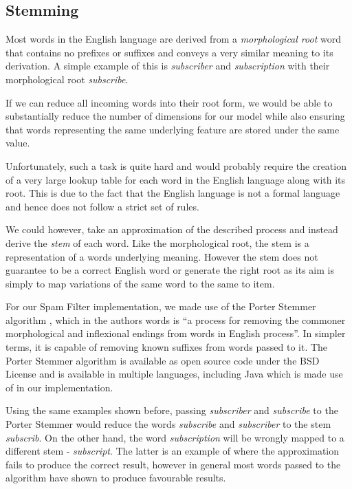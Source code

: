 \subsection{Stemming}
Most words in the English language are derived from a {\it morphological root} word that contains no prefixes or suffixes and conveys a very similar meaning to its derivation. A simple example of this is {\it subscriber} and {\it subscription} with their morphological root {\it subscribe}. 

If we can reduce all incoming words into their root form, we would be able to substantially reduce the number of dimensions for our model while also ensuring that words representing the same underlying feature are stored under the same value.

Unfortunately, such a task is quite hard and would probably require the creation of a very large lookup table for each word in the English language along with its root. This is due to the fact that the English language is not a formal language and hence does not follow a strict set of rules. 

We could however, take an approximation of the described process and instead derive the {\it stem} of each word. Like the morphological root, the stem is a representation of a words underlying meaning. However the stem does not guarantee to be a correct English word or generate the right root as its aim is simply to map variations of the same word to the same to item. 

For our Spam Filter implementation, we made use of the Porter Stemmer algorithm \cite{porter1980}, which in the authors words is ``a process for removing the commoner morphological and inflexional endings from words in English process''. In simpler terms, it is capable of removing known suffixes from words passed to it. The Porter Stemmer algorithm is available as open source code under the BSD License and is available in multiple languages, including Java which is made use of in our implementation.

Using the same examples shown before, passing {\it subscriber} and {\it subscribe} to the Porter Stemmer would reduce the words {\it subscribe} and {\it subscriber} to the stem {\it subscrib}. On the other hand, the word {\it subscription} will be wrongly mapped to a different stem - {\it subscript}. The latter is an example of where the approximation fails to produce the correct result, however in general most words passed to the algorithm have shown to produce favourable results.

